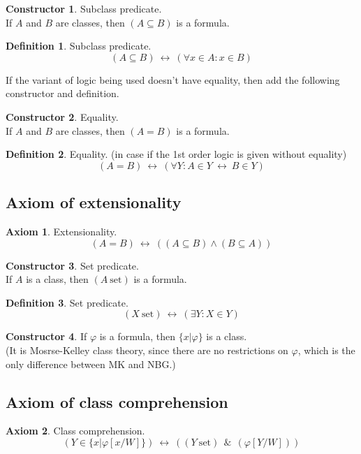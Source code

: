 \documentclass[10pt,a4paper]{article}
\theoremstyle{definition}
\newtheorem{constructor}{Constructor}[section]
\newtheorem{axiom}{Axiom}
\newtheorem{definition}{Definition}[section]
\newcommand{\AND}{\ \ \&\ \ }
\renewcommand{\iff}{\ \longleftrightarrow\ }
\newcommand{\set}{\mathrm{\ set}}
\begin{document}
\begin{constructor} Subclass predicate.\\
If $A$ and $B$ are classes, then $(A\subseteq B)$ is a formula.
\end{constructor}
\begin{definition}
\label{def:subclass}
Subclass predicate.
\[
(A\subseteq B)\iff(\forall x\in A:x\in B)
\]
\end{definition}
If the variant of logic being used doesn't have equality, then add the following constructor and definition.
\begin{constructor}Equality.\\
If $A$ and $B$ are classes, then $(A=B)$ is a formula.
\end{constructor}
\begin{definition}
Equality. (in case if the 1st order logic is given without equality)
\[
(A=B)\iff (\forall Y: A\in Y \iff B\in Y)
\]
\end{definition}
\subsection{Axiom of extensionality}
\begin{axiom}
\label{axm:extensionality}
Extensionality.
\[
(A=B)\iff ((A\subseteq B) \land (B\subseteq A))
\]
\end{axiom}
\begin{constructor} Set predicate.\\
If $A$ is a class, then $(A\set)$ is a formula.
\end{constructor}
\begin{definition} Set predicate.
\[
(X\set)\iff(\exists Y:X\in Y)
\]
\end{definition}

\begin{constructor}
If $\varphi$ is a formula, then $\{x|\varphi\}$ is a class.\\
(It is Mosrse-Kelley class theory, since there are no restrictions on $\varphi$, which is the only difference between MK and NBG.)
\end{constructor}
\subsection{Axiom of class comprehension}
\begin{axiom}
\label{axm:comprehension}
Class comprehension.
\[
(Y\in\{x|\varphi[x/W]\}) \iff ((Y\set)\AND(\varphi[Y/W]))
\]
\end{axiom}
\end{document}
